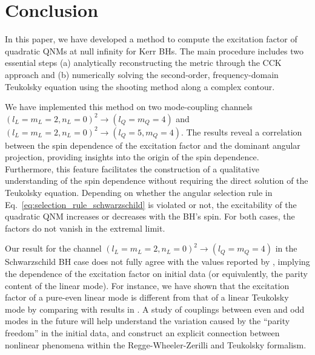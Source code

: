 \documentclass[aps,prd,amsmath,floats,floatfix, twocolumn,
superscriptaddress,nofootinbib,showpacs]{revtex4-1}
\begin{document}
\section{Conclusion}
\label{sec:conclusion}
In this paper, we have developed a method to compute the excitation factor of quadratic QNMs at null infinity for Kerr BHs. The main procedure includes two essential steps (a) analytically reconstructing the metric through the CCK approach and (b) numerically solving the second-order, frequency-domain Teukolsky equation using the shooting method along a complex contour. 

We have implemented this method on two mode-coupling channels $(l_L=m_L=2,n_L=0)^2 \to (l_Q=m_Q=4)$ and $(l_L=m_L=2,n_L=0)^2 \to (l_Q=5,m_Q=4)$. The results reveal a correlation between the spin dependence of the excitation factor and the dominant angular projection, providing insights into the origin of the spin dependence. Furthermore, this feature facilitates the construction of a qualitative understanding of the spin dependence without requiring the direct solution of the Teukolsky equation. Depending on whether the angular selection rule in Eq.~\eqref{eq:selection_rule_schwarzschild} is violated or not, the excitability of the quadratic QNM increases or decreases with the BH's spin. For both cases, the factors do not vanish in the extremal limit.

Our result for the channel $(l_L=m_L=2,n_L=0)^2 \to (l_Q=m_Q=4)$ in the Schwarzschild BH case does not fully agree with the values reported by \cite{Zhu:2024rej,Redondo-Yuste:2023seq}, implying the dependence of the excitation factor on initial data (or equivalently, the parity content of the linear mode). For instance, we have shown that the excitation factor of a pure-even linear mode is different from that of a linear Teukolsky mode by comparing with results in \cite{Nakano:2007cj}. A study of couplings between even and odd modes in the future will help understand the variation caused by the ``parity freedom'' in the initial data, and construct an explicit connection between nonlinear phenomena within the Regge-Wheeler-Zerilli and Teukolsky formalism.
\end{document}
